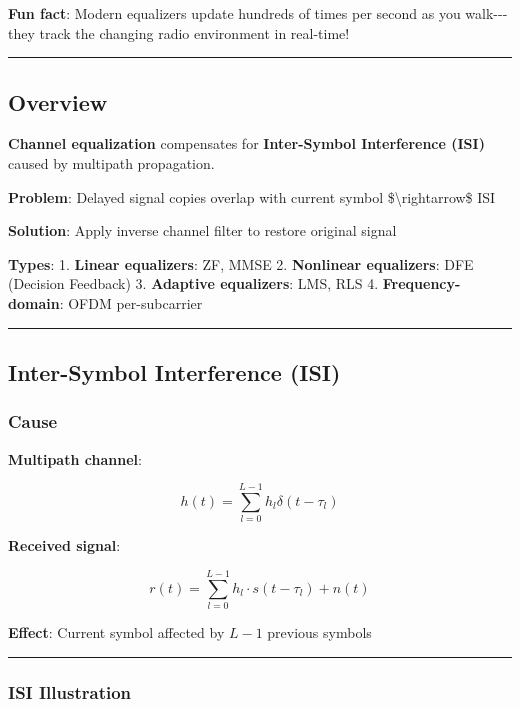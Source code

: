 \textbf{Fun fact}: Modern equalizers update hundreds of times per second
as you walk-\/-\/-they track the changing radio environment in
real-time!

\begin{center}\rule{0.5\linewidth}{0.5pt}\end{center}

\subsection{Overview}\label{overview}

\textbf{Channel equalization} compensates for \textbf{Inter-Symbol
Interference (ISI)} caused by multipath propagation.

\textbf{Problem}: Delayed signal copies overlap with current symbol
\$\textbackslash rightarrow\$ ISI

\textbf{Solution}: Apply inverse channel filter to restore original
signal

\textbf{Types}: 1. \textbf{Linear equalizers}: ZF, MMSE 2.
\textbf{Nonlinear equalizers}: DFE (Decision Feedback) 3.
\textbf{Adaptive equalizers}: LMS, RLS 4. \textbf{Frequency-domain}:
OFDM per-subcarrier

\begin{center}\rule{0.5\linewidth}{0.5pt}\end{center}

\subsection{Inter-Symbol Interference
(ISI)}\label{inter-symbol-interference-isi}

\subsubsection{Cause}\label{cause}

\textbf{Multipath channel}:

\[
h(t) = \sum_{l=0}^{L-1} h_l \delta(t - \tau_l)
\]

\textbf{Received signal}:

\[
r(t) = \sum_{l=0}^{L-1} h_l \cdot s(t - \tau_l) + n(t)
\]

\textbf{Effect}: Current symbol affected by \(L-1\) previous symbols

\begin{center}\rule{0.5\linewidth}{0.5pt}\end{center}

\subsubsection{ISI Illustration}\label{isi-illustration}

